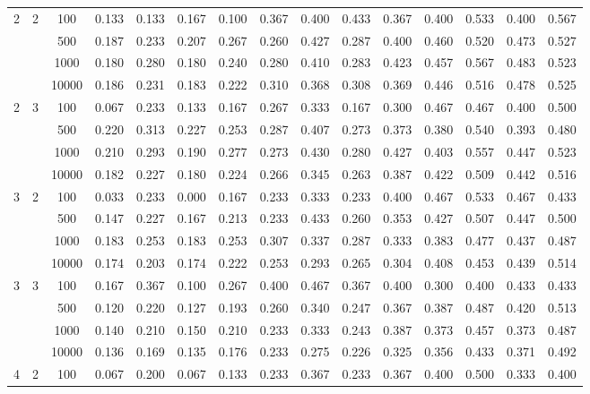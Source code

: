 \documentclass[12pt]{article}
\begin{document}
{\begin{longtable}{ccccccccccccccc}
    \hline
    2 & 2 & 100 & 0.133 & 0.133 & 0.167 & 0.100 & 0.367 & 0.400 & 0.433 & 0.367 & 0.400 & 0.533 & 0.400 & 0.567 \\
      &   & 500 & 0.187 & 0.233 & 0.207 & 0.267 & 0.260 & 0.427 & 0.287 & 0.400 & 0.460 & 0.520 & 0.473 & 0.527 \\
      &   & 1000 & 0.180 & 0.280 & 0.180 & 0.240 & 0.280 & 0.410 & 0.283 & 0.423 & 0.457 & 0.567 & 0.483 & 0.523 \\
      &   & 10000 & 0.186 & 0.231 & 0.183 & 0.222 & 0.310 & 0.368 & 0.308 & 0.369 & 0.446 & 0.516 & 0.478 & 0.525 \\
    \hline
    2 & 3 & 100 & 0.067 & 0.233 & 0.133 & 0.167 & 0.267 & 0.333 & 0.167 & 0.300 & 0.467 & 0.467 & 0.400 & 0.500 \\
      &   & 500 & 0.220 & 0.313 & 0.227 & 0.253 & 0.287 & 0.407 & 0.273 & 0.373 & 0.380 & 0.540 & 0.393 & 0.480 \\
      &   & 1000 & 0.210 & 0.293 & 0.190 & 0.277 & 0.273 & 0.430 & 0.280 & 0.427 & 0.403 & 0.557 & 0.447 & 0.523 \\
      &   & 10000 & 0.182 & 0.227 & 0.180 & 0.224 & 0.266 & 0.345 & 0.263 & 0.387 & 0.422 & 0.509 & 0.442 & 0.516 \\
    \hline
    3 & 2 & 100 & 0.033 & 0.233 & 0.000 & 0.167 & 0.233 & 0.333 & 0.233 & 0.400 & 0.467 & 0.533 & 0.467 & 0.433 \\
      &   & 500 & 0.147 & 0.227 & 0.167 & 0.213 & 0.233 & 0.433 & 0.260 & 0.353 & 0.427 & 0.507 & 0.447 & 0.500 \\
      &   & 1000 & 0.183 & 0.253 & 0.183 & 0.253 & 0.307 & 0.337 & 0.287 & 0.333 & 0.383 & 0.477 & 0.437 & 0.487 \\
      &   & 10000 & 0.174 & 0.203 & 0.174 & 0.222 & 0.253 & 0.293 & 0.265 & 0.304 & 0.408 & 0.453 & 0.439 & 0.514 \\
    \hline
    3 & 3 & 100 & 0.167 & 0.367 & 0.100 & 0.267 & 0.400 & 0.467 & 0.367 & 0.400 & 0.300 & 0.400 & 0.433 & 0.433 \\
      &   & 500 & 0.120 & 0.220 & 0.127 & 0.193 & 0.260 & 0.340 & 0.247 & 0.367 & 0.387 & 0.487 & 0.420 & 0.513 \\
      &   & 1000 & 0.140 & 0.210 & 0.150 & 0.210 & 0.233 & 0.333 & 0.243 & 0.387 & 0.373 & 0.457 & 0.373 & 0.487 \\
      &   & 10000 & 0.136 & 0.169 & 0.135 & 0.176 & 0.233 & 0.275 & 0.226 & 0.325 & 0.356 & 0.433 & 0.371 & 0.492 \\
    \hline
    4 & 2 & 100 & 0.067 & 0.200 & 0.067 & 0.133 & 0.233 & 0.367 & 0.233 & 0.367 & 0.400 & 0.500 & 0.333 & 0.400 \\

\end{longtable}}
\end{document}
